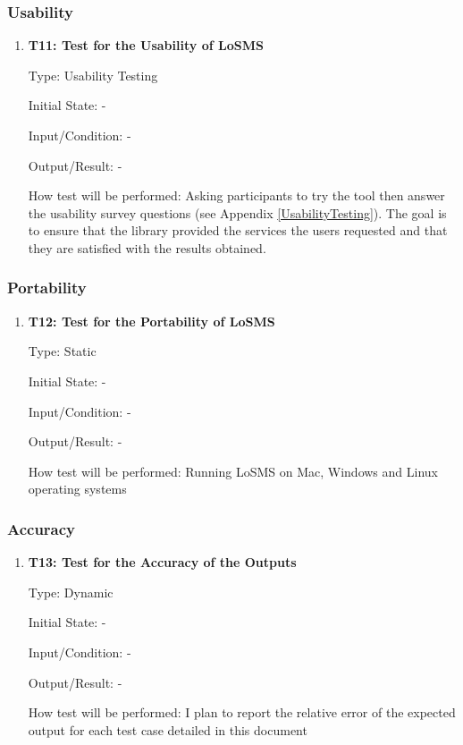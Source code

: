 \documentclass[12pt, titlepage]{article}
\newcommand{\famname}{LoSMS} %
\begin{document}
\subsubsection{Usability}

\begin{enumerate}
	\item{\textbf{T11: Test for the Usability of \famname{}}}
	
	Type: Usability Testing
						
	Initial State: -
						
	Input/Condition: -
						
	Output/Result: -
						
	How test will be performed: Asking participants to try the tool then answer 
	the usability survey questions (see Appendix \ref{UsabilityTesting}). The 
	goal is to ensure that the library provided the services the users 
	requested and that they are satisfied with the results obtained.
\end{enumerate}

\subsubsection{Portability}

\begin{enumerate}
	\item{\textbf{T12: Test for the Portability of \famname{}}}
	
	Type: Static
	
	Initial State: -
	
	Input/Condition: -
	
	Output/Result: -
	
	How test will be performed: Running \famname{} on Mac, Windows and Linux 
	operating systems
\end{enumerate}

\subsubsection{Accuracy}

\begin{enumerate}
	\item{\textbf{T13: Test for the Accuracy of the Outputs}}

	Type: Dynamic
	
	Initial State: -
	
	Input/Condition: -
	
	Output/Result: -
	
	How test will be performed: I plan to report the relative error of the 
	expected output for each test case detailed in this document
\end{enumerate}
\end{document}
